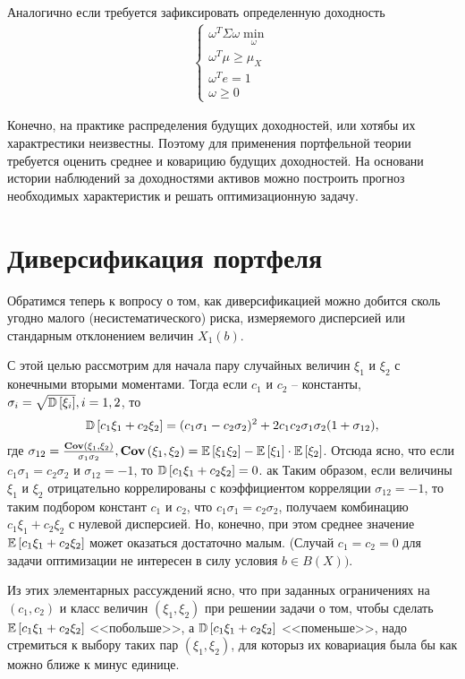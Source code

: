 Аналогично если требуется зафиксировать определенную доходность
\begin{align}
	\begin{cases}
		\omega^T \Sigma \omega \min_{\omega} \\
		\omega^T \mu \ge \mu_X \\
		\omega^T e = 1 \\
		\omega \ge 0
	\end{cases}
\end{align}

Конечно, на практике распределения будущих доходностей, или хотябы их характрестики неизвестны.
Поэтому для применения портфельной теории требуется оценить среднее и коварицию будущих доходностей.
На основани истории наблюдений за доходностями активов можно построить прогноз необходимых характеристик
и решать оптимизационную задачу.

\section{Диверсификация портфеля}

Обратимся теперь к вопросу о том, как диверсификацией можно добится сколь угодно малого (несистематического) риска, измеряемого дисперсией
или стандарным отклонением величин $X_1(b)$.

С этой целью рассмотрим для начала пару случайных величин $\xi_1$ и $\xi_2$ с конечными вторыми моментами. Тогда если $c_1$ и $c_2$ -- константы,
$\sigma_i = \sqrt{\mathbb{D}\left[\xi_i\right]}, i=1,2$, то 
\begin{align}
\mathbb{D}\left[c_1 \xi_1 + c_2 \xi_2\right] = 
	(c_1 \sigma_1 - c_2 \sigma_2)^2 + 2 c_1 c_2 \sigma_1 \sigma_2 (1 + \sigma_{12}),
\end{align}
где $\sigma_{12} = \frac{\textbf{Cov}\left(\xi_1, \xi_2\right)}{\sigma_1 \sigma_2}, \textbf{Cov}\left(\xi_1, \xi_2\right) = \mathbb{E}\left[\xi_1 \xi_2\right] - \mathbb{E}\left[\xi_1\right] \cdot \mathbb{E}\left[\xi_2\right]$.
Отсюда ясно, что если $c_1 \sigma_1 = c_2 \sigma_2$ и $\sigma_{12} = -1$, то $\mathbb{D}\left[c_1 \xi_1 + c_2 \xi_2\right] = 0$.
ак
Таким образом, если величины $\xi_1$ и $\xi_2$ отрицательно коррелированы с коэффициентом корреляции $\sigma_{12} = -1$, то таким подбором
констант $c_1$ и $c_2$, что $c_1 \sigma_1 = c_2 \sigma_2$, получаем комбинацию $c_1 \xi_1 + c_2 \xi_2$ с нулевой дисперсией. Но,
конечно, при этом среднее значение $\mathbb{E}\left[c_1 \xi_1 + c_2 \xi_2\right]$ может оказаться достаточно малым. (Случай $c_1 = c_2 = 0$ для задачи 
оптимизации не интересен в силу условия $b \in B(X))$.

Из этих элементарных рассуждений ясно, что при заданных ограничениях на $(c_1, c_2)$ и класс величин $(\xi_1, \xi_2)$ при решении задачи о том,
чтобы сделать $\mathbb{E}\left[c_1 \xi_1 + c_2 \xi_2\right]$ <<побольше>>, а $\mathbb{D}\left[c_1 \xi_1 + c_2 \xi_2\right]$ <<поменьше>>, надо стремиться к выбору таких пар 
$(\xi_1, \xi_2)$, для которыз их ковариация была бы как можно ближе к минус единице.

